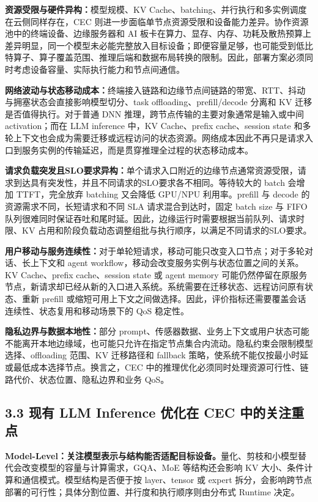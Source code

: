 \textbf{资源受限与硬件异构：}模型规模、KV Cache、batching、并行执行和多实例调度在云侧同样存在，CEC 则进一步面临单节点资源受限和设备能力差异。协作资源池中的终端设备、边缘服务器和 AI 板卡在算力、显存、内存、功耗及散热预算上差异明显，同一个模型未必能完整放入目标设备；即便容量足够，也可能受到低比特算子、算子覆盖范围、推理后端和数据布局转换的限制。因此，部署方案必须同时考虑设备容量、实际执行能力和节点间通信。

\textbf{网络波动与状态移动成本：}终端接入链路和边缘节点间链路的带宽、RTT、抖动与拥塞状态会直接影响模型切分、task offloading、prefill/decode 分离和 KV 迁移是否值得执行。对于普通 DNN 推理，跨节点传输的主要对象通常是输入或中间 activation；而在 LLM inference 中，KV Cache、prefix cache、session state 和多轮上下文也会成为需要迁移或远程访问的状态资源。网络成本因此不再只是请求入口到服务实例的传输延迟，而是贯穿推理全过程的状态移动成本。

\textbf{请求负载突发且SLO要求异构：}单个请求入口附近的边缘节点通常资源受限，请求到达具有突发性，并且不同请求的SLO要求各不相同。等待较大的 batch 会增加 TTFT，完全放弃 batching 又会降低 GPU/NPU 利用率。prefill 与 decode 的资源需求不同，长短请求和不同 SLA 请求混合到达时，固定 batch size 与 FIFO 队列很难同时保证吞吐和尾时延。因此，边缘运行时需要根据当前队列、请求时限、KV 占用和阶段负载动态调整组批与执行顺序，以满足不同请求的SLO要求。

\textbf{用户移动与服务连续性：}对于单轮短请求，移动可能只改变入口节点；对于多轮对话、长上下文和 agent workflow，移动会改变服务实例与状态位置之间的关系。KV Cache、prefix cache、session state 或 agent memory 可能仍然停留在原服务节点，新请求却已经从新的入口进入系统。系统需要在迁移状态、远程访问原有状态、重新 prefill 或缩短可用上下文之间做选择。因此，评价指标还需要覆盖会话连续性、状态复用和移动场景下的 QoS 稳定性。

\textbf{隐私边界与数据本地性：}部分 prompt、传感器数据、业务上下文或用户状态可能不能离开本地边缘域，也可能只允许在指定节点集合内流动。隐私约束会限制模型选择、offloading 范围、KV 迁移路径和 fallback 策略，使系统不能仅按最小时延或最低成本选择节点。换言之，CEC 中的推理优化必须同时处理资源可行性、链路代价、状态位置、隐私边界和业务 QoS。

\subsection*{3.3 现有 LLM Inference 优化在 CEC 中的关注重点}

\textbf{Model-Level：关注模型表示与结构能否适配目标设备。}量化、剪枝和小模型替代会改变模型的容量与计算需求，GQA、MoE 等结构还会影响 KV 大小、条件计算和通信模式。模型结构是否便于按 layer、tensor 或 expert 拆分，会影响跨节点部署的可行性；具体分割位置、并行度和执行顺序则由分布式 Runtime 决定。

